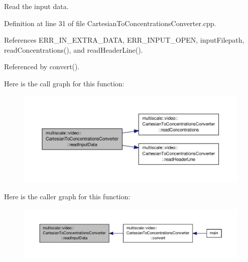 Read the input data. 



Definition at line 31 of file Cartesian\-To\-Concentrations\-Converter.\-cpp.



References E\-R\-R\-\_\-\-I\-N\-\_\-\-E\-X\-T\-R\-A\-\_\-\-D\-A\-T\-A, E\-R\-R\-\_\-\-I\-N\-P\-U\-T\-\_\-\-O\-P\-E\-N, input\-Filepath, read\-Concentrations(), and read\-Header\-Line().



Referenced by convert().



Here is the call graph for this function\-:\nopagebreak
\begin{figure}[H]
\begin{center}
\leavevmode
\includegraphics[width=350pt]{classmultiscale_1_1video_1_1CartesianToConcentrationsConverter_a94094cdeaf0f48164911188709dc0e2f_cgraph}
\end{center}
\end{figure}




Here is the caller graph for this function\-:\nopagebreak
\begin{figure}[H]
\begin{center}
\leavevmode
\includegraphics[width=350pt]{classmultiscale_1_1video_1_1CartesianToConcentrationsConverter_a94094cdeaf0f48164911188709dc0e2f_icgraph}
\end{center}
\end{figure}




